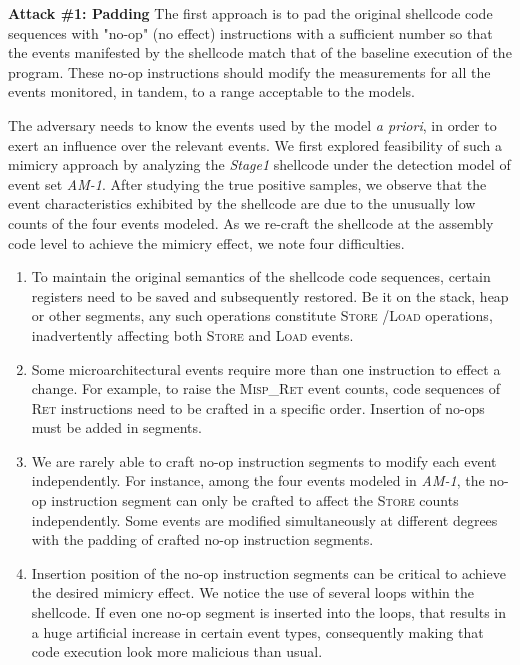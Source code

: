 \documentclass{acm_proc_article-sp}
\begin{document}
\textbf{Attack \#1: Padding} \space\space The first approach is to pad 
the original shellcode code sequences with "no-op" (no effect) 
instructions with a sufficient number
so that the events manifested by the shellcode match that of the 
baseline execution of the program. These no-op instructions should modify 
the measurements for all the events monitored, in tandem, to a range 
acceptable to the models.

The adversary needs to know the events used by the model \textit{a priori}, in 
order to exert an influence over the relevant events. We first explored 
feasibility of such a mimicry approach by analyzing the \textit{Stage1} 
shellcode under the detection model of event set \textit{AM-1}. After 
studying the true positive samples, we observe that the event 
characteristics exhibited by the shellcode are due to the unusually low 
counts of the four events modeled. As we re-craft the shellcode at the 
assembly code level to achieve the mimicry effect, we note four difficulties.

\begin{enumerate}
	\item To maintain the original semantics of the shellcode code sequences, certain registers need to be saved and subsequently restored. Be it on the stack, heap or other segments, any such operations constitute \textsc{Store} /\textsc{Load} operations, inadvertently affecting both \textsc{Store} and \textsc{Load} events.
	\item Some microarchitectural events require more than one instruction to effect a change. For example, to raise the \textsc{Misp\_Ret} event counts, code sequences of \textsc{Ret} instructions need to be crafted in a specific order. Insertion of no-ops must be added in segments.
	\item We are rarely able to craft no-op instruction segments to modify each event independently. For instance, among the four events modeled in \textit{AM-1}, the no-op instruction segment can only be crafted to affect the \textsc{Store} counts independently. Some events are modified simultaneously at different degrees with the padding of crafted no-op instruction segments.
	\item Insertion position of the no-op instruction segments can be critical to achieve the desired mimicry effect. We notice the use of several loops within the shellcode. If even one no-op segment is inserted into the loops, that results in a huge artificial increase in certain event types, consequently making that code execution look more malicious than usual.
\end{enumerate}
\end{document}
